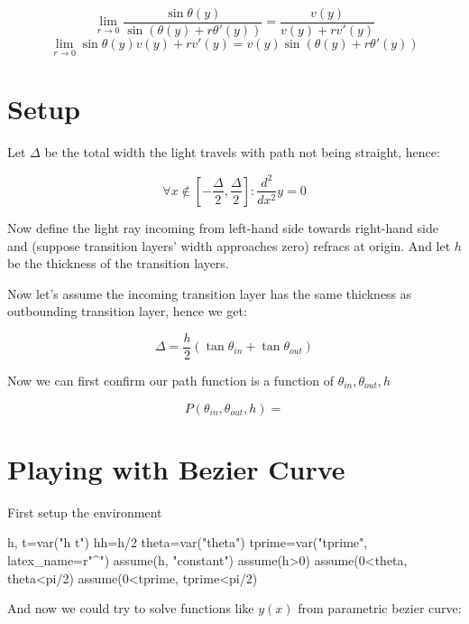 \documentclass[preprint]{ptephy_v1}%
\begin{document}
\begin{equation}
    \lim_{r\to 0}
    \frac{\sin\theta(y)}{\sin\left(\theta(y)+r\theta'(y)\right)}=
    \frac{v(y)}{v(y)+rv'(y)}
\end{equation}
\begin{equation}
    \lim_{r\to 0}
    {\sin\theta(y)}{v(y)+rv'(y)}=
    {v(y)}{\sin\left(\theta(y)+r\theta'(y)\right)}
\end{equation}

\newpage

\section{Setup}

Let $\Delta$ be the total width the light travels with path not being straight, hence:

\begin{equation}
\forall x\notin[-\frac{\Delta}{2}, \frac{\Delta}{2}]: \frac{d^2}{dx^2}y=0
\end{equation}

Now define the light ray incoming from left-hand side towards right-hand side and (suppose transition layers' width approaches zero) refracs at origin. And let $h$ be the thickness of the transition layers.

Now let's assume the incoming transition layer has the same thickness as outbounding transition layer, hence we get:

\begin{equation}
\Delta=\frac{h}{2}(\tan\theta_{in}+\tan\theta_{out})
\end{equation}

Now we can first confirm our path function is a function of $\theta_{in}, \theta_{out}, h$

\begin{equation}
P(\theta_{in}, \theta_{out}, h)=
\end{equation}


\section{Playing with Bezier Curve}
First setup the environment
\begin{sageblock}
h, t=var("h t")
hh=h/2
theta=var("theta")
tprime=var("tprime", latex_name=r"\theta^\prime")
assume(h, "constant")
assume(h>0)
assume(0<theta, theta<pi/2)
assume(0<tprime, tprime<pi/2)
\end{sageblock}

And now we could try to solve functions like $y(x)$ from parametric bezier curve:
\end{document}
